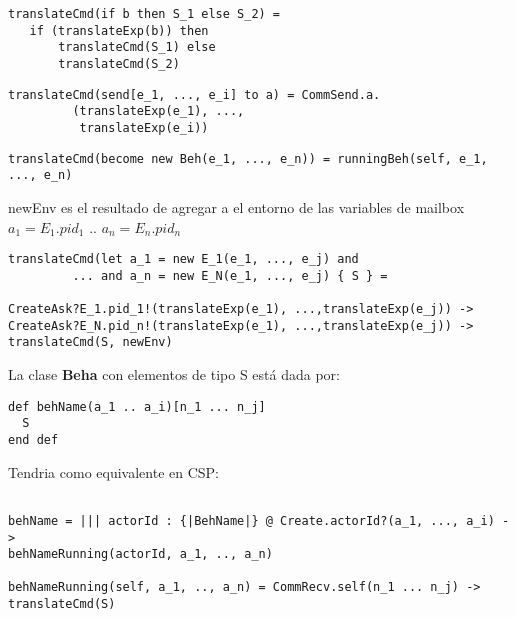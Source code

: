 \begin{verbatim}
translateCmd(if b then S_1 else S_2) = 
   if (translateExp(b)) then
       translateCmd(S_1) else 
       translateCmd(S_2)
\end{verbatim}

\begin{verbatim}
translateCmd(send[e_1, ..., e_i] to a) = CommSend.a.
         (translateExp(e_1), ..., 
          translateExp(e_i)) 
\end{verbatim}

\begin{verbatim}
translateCmd(become new Beh(e_1, ..., e_n)) = runningBeh(self, e_1, ..., e_n)
\end{verbatim}

newEnv es el resultado de agregar a el entorno de las variables de mailbox $a_1
= E_1.pid_1$ .. $a_n = E_n.pid_n$
\begin{verbatim}
translateCmd(let a_1 = new E_1(e_1, ..., e_j) and 
         ... and a_n = new E_N(e_1, ..., e_j) { S } = 

CreateAsk?E_1.pid_1!(translateExp(e_1), ...,translateExp(e_j)) ->
CreateAsk?E_N.pid_n!(translateExp(e_1), ...,translateExp(e_j)) ->
translateCmd(S, newEnv)
\end{verbatim}


La clase \textbf{Beha} con elementos de tipo S está dada por:

\begin{verbatim}
def behName(a_1 .. a_i)[n_1 ... n_j]
  S
end def
\end{verbatim}

Tendria como equivalente en CSP:

\begin{verbatim}

behName = ||| actorId : {|BehName|} @ Create.actorId?(a_1, ..., a_i) ->
behNameRunning(actorId, a_1, .., a_n)

behNameRunning(self, a_1, .., a_n) = CommRecv.self(n_1 ... n_j) -> translateCmd(S)

\end{verbatim}
